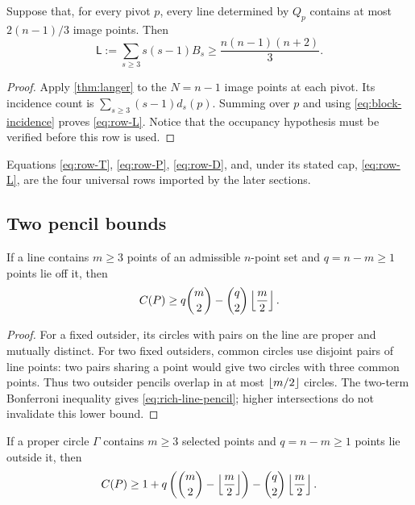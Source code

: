 \begin{proposition}\label{prop:universal-langer-row}
Suppose that, for every pivot $p$, every line determined by $Q_p$ contains
at most $2(n-1)/3$ image points.  Then
\begin{equation}\label{eq:row-L}
 \mathsf L:=\sum_{s\geq3}s(s-1)B_s
 \geq\frac{n(n-1)(n+2)}{3}.
\end{equation}
\end{proposition}

\begin{proof}
Apply \cref{thm:langer} to the $N=n-1$ image points at each pivot.  Its
incidence count is $\sum_{s\geq3}(s-1)d_s(p)$.  Summing over $p$ and using
\eqref{eq:block-incidence} proves \eqref{eq:row-L}.  Notice that the
occupancy hypothesis must be verified before this row is used.
\end{proof}

Equations \eqref{eq:row-T}, \eqref{eq:row-P}, \eqref{eq:row-D}, and,
under its stated cap, \eqref{eq:row-L}, are the four universal rows imported
by the later sections.

\subsection{Two pencil bounds}

\begin{lemma}\label{lem:rich-line-pencil}
If a line contains $m\geq3$ points of an admissible $n$-point set and
$q=n-m\geq1$ points lie off it, then
\begin{equation}\label{eq:rich-line-pencil}
 C(P)\geq q\binom m2-\binom q2\left\lfloor \frac m2\right\rfloor.
\end{equation}
\end{lemma}

\begin{proof}
For a fixed outsider, its circles with pairs on the line are proper and
mutually distinct.  For two fixed outsiders, common circles use disjoint
pairs of line points: two pairs sharing a point would give two circles with
three common points.  Thus two outsider pencils overlap in at most
$\left\lfloor m/2\right\rfloor$ circles.  The two-term Bonferroni inequality gives
\eqref{eq:rich-line-pencil}; higher intersections do not invalidate this
lower bound.
\end{proof}

\begin{lemma}\label{lem:rich-circle-pencil}
If a proper circle $\Gamma$ contains $m\geq3$ selected points and
$q=n-m\geq1$ points lie outside it, then
\begin{equation}\label{eq:rich-circle-pencil}
 C(P)\geq
 1+q\left(\binom m2-\left\lfloor \frac m2\right\rfloor\right)
   -\binom q2\left\lfloor \frac m2\right\rfloor.
\end{equation}
\end{lemma}

